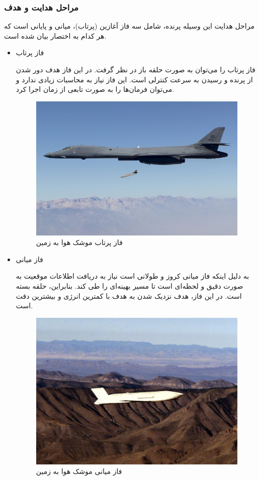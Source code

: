\subsubsection{مراحل هدایت و هدف}
مراحل هدایت این وسیله پرنده، شامل سه فاز آغازین (پرتاب)، میانی و پایانی است که هر کدام به اختصار بیان شده است.
\begin{itemize}
	\item فاز پرتاب
	
	
	فاز پرتاب را می‌توان به صورت حلقه باز در نظر گرفت. در این فاز هدف دور شدن از پرنده و رسیدن به سرعت کنترلی است. 
	این فاز نیاز به محاسبات زیادی ندارد و می‌توان فرمان‌ها را به صورت تابعی از زمان اجرا کرد.
	 \begin{figure}[H]
		\centering
		\includegraphics[width=\linewidth]{../Figure/Q1/start.jpg}
		\caption{فاز پرتاب موشک هوا به زمین
		}
	\end{figure}
	
	\item فاز میانی
	
	
	به دلیل اینکه فاز میانی کروز و طولانی است نیاز به دریافت اطلاعات موقعیت به صورت دقیق و لحظه‌ای است تا مسیر بهینه‌ای را طی کند. بنابراین، حلقه بسته است. در این فاز، هدف نزدیک شدن به هدف با کمترین انرژی و بیشترین دقت است.
		 \begin{figure}[H]
		\centering
		\includegraphics[width=\linewidth]{../Figure/Q1/cruise.jpg}
		\caption{فاز میانی موشک هوا به زمین
		}
	\end{figure}


\end{itemize}
